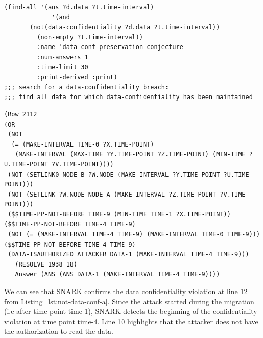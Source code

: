 \begin{lstlisting}[caption=SNARK question to detect the data confidentiality violation., label=lst:not-data-conf-q] 
   (find-all '(ans ?d.data ?t.time-interval)
             '(and
       (not(data-confidentiality ?d.data ?t.time-interval))
         (non-empty ?t.time-interval))
         :name 'data-conf-preservation-conjecture
         :num-answers 1
         :time-limit 30
         :print-derived :print)
;;; search for a data-confidentiality breach:
;;; find all data for which data-confidentiality has been maintained

\end{lstlisting}
\begin{lstlisting}[caption=SNARK detecting the data confidentiality violation., label=lst:not-data-conf-a] 
(Row 2112  
(OR
 (NOT
  (= (MAKE-INTERVAL TIME-0 ?X.TIME-POINT)
   (MAKE-INTERVAL (MAX-TIME ?Y.TIME-POINT ?Z.TIME-POINT) (MIN-TIME ?U.TIME-POINT ?V.TIME-POINT))))
 (NOT (SETLINK0 NODE-B ?W.NODE (MAKE-INTERVAL ?Y.TIME-POINT ?U.TIME-POINT)))
 (NOT (SETLINK ?W.NODE NODE-A (MAKE-INTERVAL ?Z.TIME-POINT ?V.TIME-POINT)))
 ($$TIME-PP-NOT-BEFORE TIME-9 (MIN-TIME TIME-1 ?X.TIME-POINT)) ($$TIME-PP-NOT-BEFORE TIME-4 TIME-9)
 (NOT (= (MAKE-INTERVAL TIME-4 TIME-9) (MAKE-INTERVAL TIME-0 TIME-9))) ($$TIME-PP-NOT-BEFORE TIME-4 TIME-9)
 (DATA-ISAUTHORIZED ATTACKER DATA-1 (MAKE-INTERVAL TIME-4 TIME-9)))
   (RESOLVE 1938 18)
   Answer (ANS (ANS DATA-1 (MAKE-INTERVAL TIME-4 TIME-9)))) 
\end{lstlisting}
We can see that SNARK confirms the data confidentiality violation at line 12 from Listing~\ref{lst:not-data-conf-a}.
Since the attack started during the migration (i.e after time point time-1), SNARK detects the beginning of the confidentiality violation at time point time-4.
Line 10 highlights that the attacker does not have the authorization to read the data.

